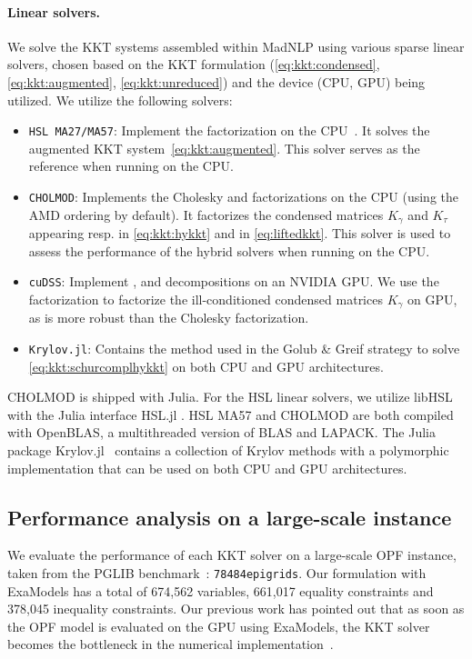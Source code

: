 \paragraph{Linear solvers.}
We solve the KKT systems assembled within MadNLP using various sparse linear solvers, chosen based on the KKT formulation (\ref{eq:kkt:condensed}, \ref{eq:kkt:augmented}, \ref{eq:kkt:unreduced}) and the device (CPU, GPU) being utilized. We utilize the following solvers:
\begin{itemize}
  \item {\tt HSL MA27/MA57}: Implement the \lblt factorization on the CPU~\cite{duff1983multifrontal}.
    It solves the augmented KKT system~\eqref{eq:kkt:augmented}.
    This solver serves as the reference when running on the CPU.
  \item {\tt CHOLMOD}: Implements the Cholesky and \ldlt factorizations on the CPU %
    (using the AMD ordering \cite{amestoy-david-duff-2004} by default).
    It factorizes the condensed matrices $K_\gamma$ and $K_\tau$ appearing
    resp. in \eqref{eq:kkt:hykkt} and in \eqref{eq:liftedkkt}.
    This solver is used to assess the performance of the hybrid solvers when running on the CPU.
  \item {\tt cuDSS}: Implement \llt, \ldlt and \lu decompositions on an NVIDIA GPU.
    We use the \ldlt factorization to factorize the ill-conditioned condensed matrices $K_\gamma$ on GPU,
    as \ldlt is more robust than the Cholesky factorization.
  \item {\tt Krylov.jl}: Contains the \CG method
    used in the Golub \& Greif strategy to solve \eqref{eq:kkt:schurcomplhykkt} on both CPU and GPU architectures.
\end{itemize}
CHOLMOD \cite{chen-davis-hager-rajamanickam-2008} is shipped with Julia.
For the HSL linear solvers, we utilize libHSL \cite{fowkes-lister-montoison-orban-2024} with the Julia interface HSL.jl \cite{montoison-orban-hsl-2021}.
HSL MA57 and CHOLMOD are both compiled with OpenBLAS, a multithreaded version of BLAS and LAPACK.
The Julia package Krylov.jl~\cite{montoison2023krylov} contains a collection of Krylov methods with a polymorphic implementation that can be used on both CPU and GPU architectures.

\subsection{Performance analysis on a large-scale instance}
\label{sec:num:pprof}
We evaluate the performance of each KKT solver on a large-scale OPF instance, taken from
the PGLIB benchmark~\cite{babaeinejadsarookolaee2019power}: {\tt 78484epigrids}.
Our formulation with ExaModels has
a total of 674,562 variables, 661,017 equality constraints and 378,045
inequality constraints.
Our previous work has pointed out that as soon as the OPF model is
evaluated on the GPU using ExaModels, the KKT solver becomes the bottleneck
in the numerical implementation~\cite{shin2023accelerating}.

